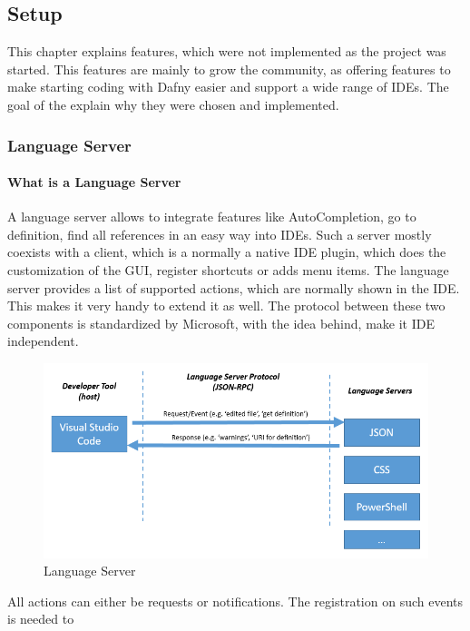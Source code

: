 \subsection{Setup}\label{setup}
This chapter explains features, which were not implemented as the project was started. This features are mainly to grow the community, as offering features to make starting coding with Dafny easier and support a wide range of IDEs. The goal of the explain why they were chosen and implemented. 

\subsubsection{Language Server} \label{setupLanguageServer}

\paragraph{What is a Language Server}
A language server allows to integrate features like AutoCompletion, go to definition, find all references in an easy way into IDEs. Such a server mostly coexists with a client, which is a normally a native IDE plugin, which does the customization of the GUI, register shortcuts or adds menu items. The language server provides a list of supported actions, which are normally shown in the IDE. This makes it very handy to extend it as well. 
The protocol between these two components is standardized by Microsoft, with the idea behind, make it IDE independent. 
 \newline
\begin{figure}[H]
	\centering
	\includegraphics[width=1.0\textwidth]{img/languageServer}
	\caption{Language Server}
	\label{fig:languageServer}
\end{figure}
All actions can either be requests or notifications. The registration on such events is needed to 

